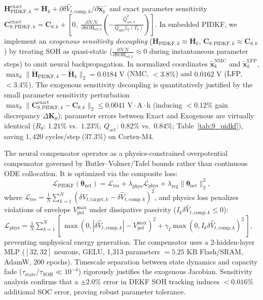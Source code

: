 \documentclass[balance,nocopyright,upint,varvw,hyphenate,barcolor=NavyBlue,nolists]{asmejour}
\begin{document}
$\mathbf{H}_{\text{PIDKF},k}^{\text{exact}} = \mathbf{H}_k + \partial \delta \hat{V}_{t,\text{comp},k}/\partial \hat{\mathbf{x}}_k^-$ and exact parameter sensitivity $\mathbf{C}_{\theta,\text{PIDKF},k}^{\text{exact}} = \mathbf{C}_{\theta,k} + [0, \; \frac{\partial \mathcal{NN}}{\partial \text{SOH}_{\text{ref},k}}(-\frac{\hat{Q}_{\text{act},k}^2}{Q_{\text{init}} f_Q(T_k)})]$. In embedded PIDKF, we implement an \emph{exogenous sensitivity decoupling} ($\mathbf{H}_{\text{PIDKF},k} \approx \mathbf{H}_k$, $\mathbf{C}_{\theta,\text{PIDKF},k} \approx \mathbf{C}_{\theta,k}$) by treating SOH as quasi-static ($\frac{\partial \mathcal{NN}}{\partial \text{SOH}_{\text{ref},k}} \approx 0$ during instantaneous parameter steps) to omit neural backpropagation. In normalized coordinates $\tilde{\mathbf{x}}_k^{\text{NMC}}$ and $\tilde{\mathbf{x}}_k^{\text{LFP}}$, $\max_k \|\tilde{\mathbf{H}}_{\text{PIDKF},k} - \tilde{\mathbf{H}}_k\|_2 = 0.0184\text{ V}$ (NMC, $<3.8\%$) and $0.0162\text{ V}$ (LFP, $<3.4\%$). The exogenous sensitivity decoupling is quantitatively justified by the small parameter sensitivity perturbation $\max_k \|\mathbf{C}_{\theta,\text{PIDKF},k}^{\text{exact}} - \mathbf{C}_{\theta,k}\|_2 \le 0.0041\text{ V}\cdot\text{A}\cdot\text{h}$ (inducing $<0.12\%$ gain discrepancy $\Delta \mathbf{K}_\theta$); parameter errors between Exact and Exogenous are virtually identical ($R_0$: $1.21\%$ vs.\ $1.23\%$; $Q_{\text{act}}$: $0.82\%$ vs.\ $0.84\%$; Table~\ref{tab:9_pidkf}), saving $1,420$ cycles/step ($37.3\%$) on Cortex-M4.

The neural compensator operates as a physics-constrained overpotential compensator governed by Butler--Volmer/Tafel bounds rather than continuous ODE collocation. It is optimized via the composite loss:
\begin{equation}\label{eqn:loss_pidkf}
\mathcal{L}_{\text{PIDKF}}(\boldsymbol{\theta}_{\text{net}}) = \mathcal{L}_{\text{res}} + \lambda_{\text{phys}} \mathcal{L}_{\text{phys}} + \lambda_{\text{reg}} \|\boldsymbol{\theta}_{\text{net}}\|_2^2,
\end{equation}
where $\mathcal{L}_{\text{res}} = \frac{1}{N}\sum_{k=1}^N (\delta V_{t,\text{target},k} - \delta \hat{V}_{t,\text{comp},k})^2$, and physics loss penalizes violations of envelope $V_{\text{pol}}^{\max}$ under dissipative passivity ($I_k \delta \hat{V}_{t,\text{comp},k} \le 0$): $\mathcal{L}_{\text{phys}} = \frac{1}{N}\sum_{k=1}^N [\,\max(0, |\delta \hat{V}_{t,\text{comp},k}| - V_{\text{pol}}^{\max})^2 + \gamma_I \max(0, I_k \delta \hat{V}_{t,\text{comp},k})^2\,]$, preventing unphysical energy generation. The compensator uses a 2-hidden-layer MLP ($[32, 32]$ neurons, GELU, 1,313 parameters $= 5.25\text{ KB}$ Flash/SRAM, AdamW, 200 epochs). Timescale separation between state dynamics and capacity fade ($\tau_{\text{state}}/\tau_{\text{SOH}} \ll 10^{-4}$) rigorously justifies the exogenous Jacobian. Sensitivity analysis confirms that a $\pm 2.0\%$ error in DEKF SOH tracking induces $<0.016\%$ additional SOC error, proving robust parameter tolerance.
\end{document}
